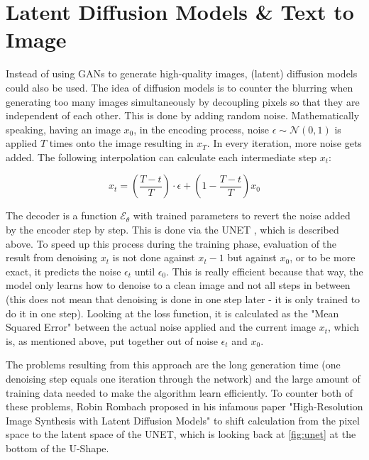 \section{Latent Diffusion Models \& Text to Image}
\label{sec:latent_diffusion_models}

Instead of using GANs to generate high-quality images, (latent) diffusion models could also be used. The idea of diffusion models is to counter the blurring when generating too many images simultaneously by decoupling pixels so that they are independent of each other. This is done by adding random noise. Mathematically speaking, having an image $x_0$, in the encoding process, noise $\epsilon \sim  \mathcal{N}(0, 1)$ is applied $T$ times onto the image resulting in $x_T$. In every iteration, more noise gets added. The following interpolation can calculate each intermediate step $x_t$:

\begin{equation}
x_t = \left(\frac{T - t}{T}\right) \cdot \epsilon  + \left(1 - \frac{T - t}{T}\right) x_0
\end{equation}

The decoder is a function $\mathcal{E}_\theta$ with trained parameters to revert the noise added by the encoder step by step. This is done via the UNET \cite{peebles2023scalablediffusionmodelstransformers}, which is described above. To speed up this process during the training phase, evaluation of the result from denoising $x_t$ is not done against $x_t - 1$ but against $x_0$, or to be more exact, it predicts the noise $\epsilon_t$ until $\epsilon_0$. This is really efficient because that way, the model only learns how to denoise to a clean image and not all steps in between (this does not mean that denoising is done in one step later - it is only trained to do it in one step). Looking at the loss function, it is calculated as the "Mean Squared Error" between the actual noise applied and the current image $x_t$, which is, as mentioned above, put together out of noise $\epsilon_t$ and $x_0$.

The problems resulting from this approach are the long generation time (one denoising step equals one iteration through the network) and the large amount of training data needed to make the algorithm learn efficiently. To counter both of these problems, Robin Rombach proposed in his infamous paper "High-Resolution Image Synthesis with Latent Diffusion Models" \cite{rombach2022highresolution} to shift calculation from the pixel space to the latent space of the UNET, which is looking back at \autoref{fig:unet} at the bottom of the U-Shape.

